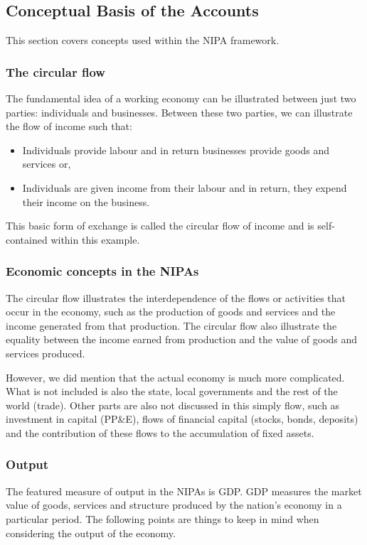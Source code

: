 \documentclass[12pt, letterpaper]{article}
\begin{document}
{\subsection{Conceptual Basis of the Accounts}
This section covers concepts used within the NIPA framework.
\subsubsection{The circular flow}
The fundamental idea of a working economy can be illustrated between just two parties: individuals and businesses. Between these two parties, we can illustrate the flow of income such that:
\begin{itemize}
	\item Individuals provide labour and in return businesses provide goods and services or,
	\item Individuals are given income from their labour and in return, they expend their income on the business.
\end{itemize}
This basic form of exchange is called the circular flow of income and is self-contained within this example.

\subsubsection{Economic concepts in the NIPAs}
The circular flow illustrates the interdependence of the flows or activities that occur in the economy, such as the production of goods and services and the income generated from that production. The circular flow also illustrate the equality between the income earned from production and the value of goods and services produced.

\vspace{10pt}
\noindent However, we did mention that the actual economy is much more complicated. What is not included is also the state, local governments and the rest of the world (trade). Other parts are also not discussed in this simply flow, such as investment in capital (PP\&E), flows of financial capital (stocks, bonds, deposits) and the contribution of these flows to the accumulation of fixed assets.

\subsubsection{Output}
The featured measure of output in the NIPAs is GDP. GDP measures the market value of goods, services and structure produced by the nation's economy in a particular period. The following points are things to keep in mind when considering the output of the economy.

}
\end{document}
